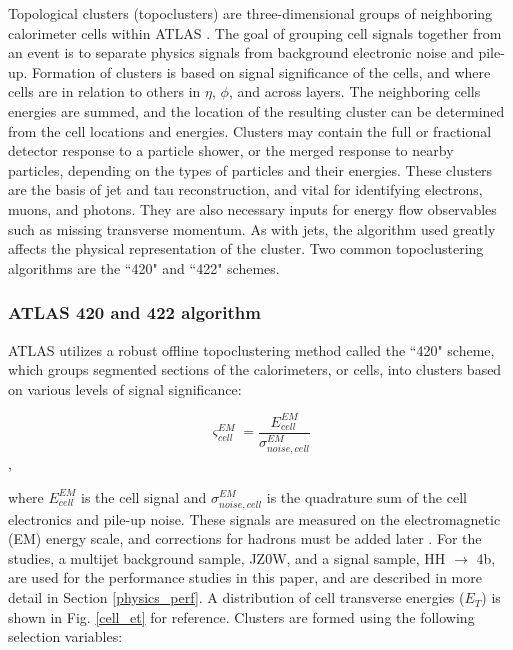 Topological clusters (topoclusters) are three-dimensional groups of neighboring calorimeter cells within ATLAS \cite{PERF-2014-07}.
The goal of grouping cell signals together from an event is to separate physics signals from background electronic noise and pile-up.
Formation of clusters is based on signal significance of the cells, and where cells are in relation to others in $\eta$, $\phi$, and across layers.
The neighboring cells energies are summed, and the location of the resulting cluster can be determined from the cell locations and energies.
Clusters may contain the full or fractional detector response to a particle shower, or the merged response to nearby particles, depending on the types of particles and their energies.
These clusters are the basis of jet and tau reconstruction, and vital for identifying electrons, muons, and photons.
They are also necessary inputs for energy flow observables such as missing transverse momentum.
As with jets, the algorithm used greatly affects the physical representation of the cluster.
Two common topoclustering algorithms are the ``420" and ``422" schemes.


\subsubsection{ATLAS 420 and 422 algorithm}

ATLAS utilizes a robust offline topoclustering method called the ``420" scheme, which groups segmented sections of the calorimeters, or cells, into clusters based on various levels of signal significance: 

\begin{equation}
    \varsigma^{EM}_{cell} = \frac{E^{EM}_{cell}}{\sigma^{EM}_{noise,cell}}
\end{equation},

where $E^{EM}_{cell}$ is the cell signal and $\sigma^{EM}_{noise,cell}$ is the quadrature sum of the cell electronics and pile-up noise.
These signals are measured on the electromagnetic (EM) energy scale, and corrections for hadrons must be added later \cite{PERF-2014-07}.
For the studies, a multijet background sample, JZ0W, and a signal sample, HH $\rightarrow$ 4b, are used for the performance studies in this paper, and are described in more detail in Section \ref{physics_perf}.
A distribution of cell transverse energies ($E_T$) is shown in Fig. \ref{cell_et} for reference.
Clusters are formed using the following selection variables:

